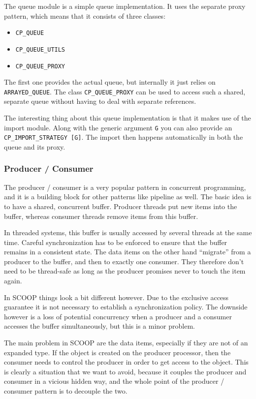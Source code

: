 \documentclass[a4paper,10pt]{report}
\begin{document}
The queue module is a simple queue implementation.
It uses the separate proxy pattern, which means that it consists of three classes:

\begin{itemize}
 \item \lstinline!CP_QUEUE!
 \item \lstinline!CP_QUEUE_UTILS!
 \item \lstinline!CP_QUEUE_PROXY!
\end{itemize}

The first one provides the actual queue, but internally it just relies on \lstinline!ARRAYED_QUEUE!.
The class \lstinline!CP_QUEUE_PROXY! can be used to access such a shared, separate queue without having to deal with separate references.

The interesting thing about this queue implementation is that it makes use of the import module.
Along with the generic argument \lstinline!G! you can also provide an \lstinline!CP_IMPORT_STRATEGY [G]!.
The import then happens automatically in both the queue and its proxy.

\subsubsection{Producer / Consumer}


The producer / consumer is a very popular pattern in concurrent programming, and it is a building block for other patterns like pipeline as well.
The basic idea is to have a shared, concurrent buffer.
Producer threads put new items into the buffer, whereas consumer threads remove items from this buffer.


In threaded systems, this buffer is usually accessed by several threads at the same time.
Careful synchronization has to be enforced to ensure that the buffer remains in a consistent state.
The data items on the other hand ``migrate'' from a producer to the buffer, and then to exactly one consumer.
They therefore don't need to be thread-safe as long as the producer promises never to touch the item again.

In SCOOP things look a bit different however.
Due to the exclusive access guarantee it is not necessary to establish a synchronization policy.
The downside however is a loss of potential concurrency when a producer and a consumer accesses the buffer simultaneously, but this is a minor problem.

The main problem in SCOOP are the data items, especially if they are not of an expanded type.
If the object is created on the producer processor, then the consumer needs to control the producer in order to get access to the object.
This is clearly a situation that we want to avoid, because it couples the producer and consumer in a vicious hidden way, and the whole point of the producer / consumer pattern is to decouple the two.
\end{document}

